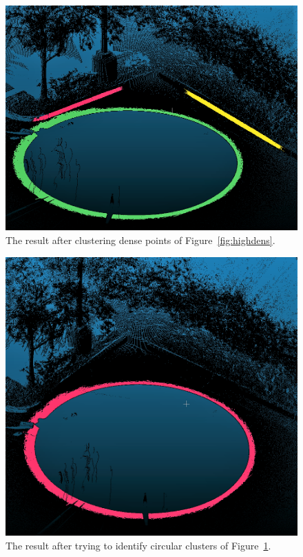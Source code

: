 \begin{figure}
  \centering
  \includegraphics[scale=0.5]{img/cluster.png}
  \caption{The result after clustering dense points of Figure~\ref{fig:highdens}.}
  \label{fig:cluster}
\end{figure}

\begin{figure}
  \centering
  \includegraphics[scale=0.5]{img/circular.png}
  \caption{The result after trying to identify circular clusters of Figure~\ref{fig:cluster}.}
  \label{fig:circular}
\end{figure}

